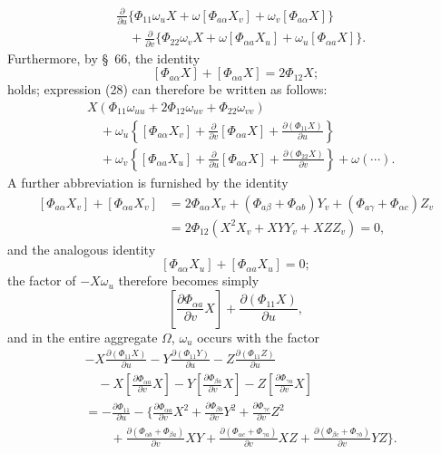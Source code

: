 \documentclass[11pt,a4paper,leqno]{article}
\begin{document}
\begin{equation}\tag{28}
\begin{aligned}
&\frac{\partial}{\partial u}\{\Phi_{11}\omega_uX
+\omega[\Phi_{a\alpha}X_v]+\omega_v[\Phi_{a\alpha}X]\}\\
&\quad+\frac{\partial}{\partial v}\{\Phi_{22}\omega_vX
+\omega[\Phi_{\alpha a}X_u]+\omega_u[\Phi_{\alpha a}X]\}.
\end{aligned}
\end{equation}
Furthermore, by \S~66, the identity
\[
[\Phi_{a\alpha}X]+[\Phi_{\alpha a}X]=2\Phi_{12}X;
\]
holds; expression (28) can therefore be written as follows:
\[
\begin{aligned}
&X(\Phi_{11}\omega_{uu}+2\Phi_{12}\omega_{uv}
+\Phi_{22}\omega_{vv})\\
&\quad+\omega_u\left\{[\Phi_{a\alpha}X_v]
+\frac{\partial}{\partial v}[\Phi_{\alpha a}X]
+\frac{\partial(\Phi_{11}X)}{\partial u}\right\}\\
&\quad+\omega_v\left\{[\Phi_{\alpha a}X_u]
+\frac{\partial}{\partial u}[\Phi_{a\alpha}X]
+\frac{\partial(\Phi_{22}X)}{\partial v}\right\}
+\omega(\cdots).
\end{aligned}
\]
A further abbreviation is furnished by the identity
\[
\begin{aligned}
[\Phi_{a\alpha}X_v]+[\Phi_{\alpha a}X_v]
&=2\Phi_{a\alpha}X_v+(\Phi_{a\beta}+\Phi_{\alpha b})Y_v
+(\Phi_{a\gamma}+\Phi_{\alpha c})Z_v\\
&=2\Phi_{12}(X^2X_v+XYY_v+XZZ_v)=0,
\end{aligned}
\]
and the analogous identity
\[
[\Phi_{a\alpha}X_u]+[\Phi_{\alpha a}X_u]=0;
\]
the factor of $-X\omega_u$ therefore becomes simply
\[
\left[\frac{\partial\Phi_{\alpha a}}{\partial v}X\right]
+\frac{\partial(\Phi_{11}X)}{\partial u},
\]
and in the entire aggregate $\Omega$, $\omega_u$ occurs with the factor
\[
\begin{aligned}
&-X\frac{\partial(\Phi_{11}X)}{\partial u}
-Y\frac{\partial(\Phi_{11}Y)}{\partial u}
-Z\frac{\partial(\Phi_{11}Z)}{\partial u}\\
&\quad-X\left[\frac{\partial\Phi_{\alpha a}}{\partial v}X\right]
-Y\left[\frac{\partial\Phi_{\beta a}}{\partial v}X\right]
-Z\left[\frac{\partial\Phi_{\gamma a}}{\partial v}X\right]\\
&=-\frac{\partial\Phi_{11}}{\partial u}
-\Biggl\{\frac{\partial\Phi_{\alpha a}}{\partial v}X^2
+\frac{\partial\Phi_{\beta b}}{\partial v}Y^2
+\frac{\partial\Phi_{\gamma c}}{\partial v}Z^2\\
&\qquad+\frac{\partial(\Phi_{\alpha b}+\Phi_{\beta a})}{\partial v}XY
+\frac{\partial(\Phi_{\alpha c}+\Phi_{\gamma a})}{\partial v}XZ
+\frac{\partial(\Phi_{\beta c}+\Phi_{\gamma b})}{\partial v}YZ\Biggr\}.
\end{aligned}
\]
\end{document}
